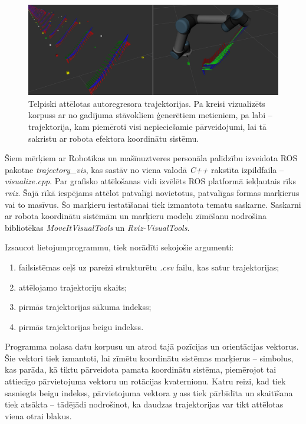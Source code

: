 \documentclass[12pt, a4paper]{article}
\numberwithin{equation}{section} %
\begin{document}
\begin{figure}[t!]
    \centering
    \includegraphics[width=16cm,page=1]{../img/trajectory_vis.png}
    \caption{Telpiski attēlotas autoregresora trajektorijas. Pa kreisi vizualizēts korpuss ar no gadījuma stāvokļiem ģenerētiem metieniem, pa labi -- trajektorija, kam piemēroti visi nepieciešamie pārveidojumi, lai tā sakristu ar robota efektora koordinātu sistēmu.}
\end{figure}

Šiem mērķiem ar Robotikas un mašīnuztveres personāla palīdzību izveidota ROS pakotne \textit{trajectory\_vis}, kas sastāv no viena valodā \textit{C++} rakstīta izpildfaila -- \textit{visualize.cpp}. Par grafisko attēlošanas vidi izvēlēts ROS platformā iekļautais rīks \textit{rviz}. Šajā rīkā iespējams attēlot patvaļīgi novietotus, patvaļīgas formas marķierus vai to masīvus. Šo marķieru iestatīšanai tiek izmantota tematu saskarne. Saskarni ar robota koordinātu sistēmām un marķieru modeļu zīmēšanu nodrošina bibliotēkas \textit{MoveItVisualTools} un \textit{Rviz-VisualTools}. 

Izsaucot lietojumprogrammu, tiek norādīti sekojošie argumenti:

\begin{enumerate}
    \item failsistēmas ceļš uz pareizi strukturētu \textit{.csv} failu, kas satur trajektorijas;
    \item attēlojamo trajektoriju skaits;
    \item pirmās trajektorijas sākuma indekss;
    \item pirmās trajektorijas beigu indekss.
\end{enumerate}

Programma nolasa datu korpusu un atrod tajā pozīcijas un orientācijas vektorus. Šie vektori tiek izmantoti, lai zīmētu koordinātu sistēmas marķierus -- simbolus, kas parāda, kā tiktu pārveidota pamata koordinātu sistēma, piemērojot tai attiecīgo pārvietojuma vektoru un rotācijas kvaternionu. Katru reizi, kad tiek sasniegts beigu indekss, pārvietojuma vektora $y$ ass tiek pārbīdīta un skaitīšana tiek atsākta -- tādējādi nodrošinot, ka daudzas trajektorijas var tikt attēlotas viena otrai blakus. 
\end{document}
